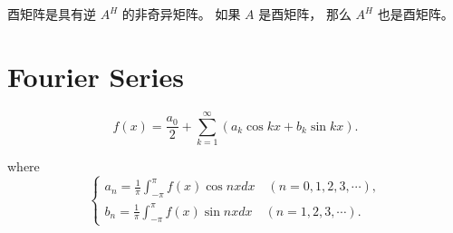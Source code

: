 酉矩阵是具有逆 $ A^{H} $ 的非奇异矩阵。 如果 $ A $ 是酉矩阵， 那么 $ A^{H} $ 也是酉矩阵。

\section{Fourier Series}

\begin{definition}[傅里叶级数]
    \begin{equation}
f(x)=\frac{a_{0}}{2}+\sum_{k=1}^{\infty}\left(a_{k} \cos k x+b_{k} \sin k x\right) .
\end{equation}

where \begin{equation} \left\{\begin{array}{l}a_{n}=\frac{1}{\pi} \int_{-\pi}^{\pi} f(x) \cos n x {d} x \quad(n=0,1,2,3, \cdots), \\ b_{n}=\frac{1}{\pi} \int_{-\pi}^{\pi} f(x) \sin n x {d} x \quad(n=1,2,3, \cdots) .\end{array}\right. \end{equation}
\end{definition}

